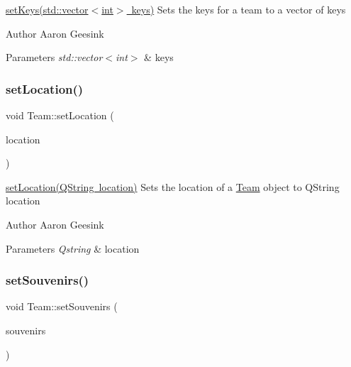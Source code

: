 \mbox{\hyperlink{class_team_a70009ebba2b8dc25c20d13a02b6b6780}{set\+Keys(std\+::vector$<$int$>$ keys)}} Sets the keys for a team to a vector of keys 

\begin{DoxyAuthor}{Author}
Aaron Geesink 
\end{DoxyAuthor}

\begin{DoxyParams}{Parameters}
{\em std\+::vector$<$int$>$} & keys \\
\hline
\end{DoxyParams}
\mbox{\label{class_team_a50b52da7424bde42a2bfad0c1e9bce9c}} 
\subsubsection{\texorpdfstring{setLocation()}{setLocation()}}
{\footnotesize\ttfamily void Team\+::set\+Location (\begin{DoxyParamCaption}\item[{Q\+String}]{location }\end{DoxyParamCaption})}



\mbox{\hyperlink{class_team_a50b52da7424bde42a2bfad0c1e9bce9c}{set\+Location(\+Q\+String location)}} Sets the location of a \mbox{\hyperlink{class_team}{Team}} object to Q\+String location 

\begin{DoxyAuthor}{Author}
Aaron Geesink 
\end{DoxyAuthor}

\begin{DoxyParams}{Parameters}
{\em Qstring} & location \\
\hline
\end{DoxyParams}
\mbox{\label{class_team_a4b82732cdbc226bf1678dbf298493c9f}} 
\subsubsection{\texorpdfstring{setSouvenirs()}{setSouvenirs()}}
{\footnotesize\ttfamily void Team\+::set\+Souvenirs (\begin{DoxyParamCaption}\item[{\mbox{\hyperlink{class_hash_map}{Hash\+Map}}$<$ int, \mbox{\hyperlink{class_souvenir}{Souvenir}}, 30, \mbox{\hyperlink{struct_my_key_hash}{My\+Key\+Hash}} $>$ $\ast$}]{souvenirs }\end{DoxyParamCaption})}




